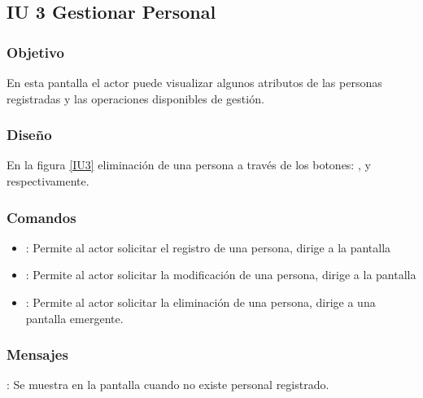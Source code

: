 \subsection{IU 3 Gestionar Personal}

\subsubsection{Objetivo}
	En esta pantalla el actor puede visualizar algunos atributos de las personas registradas y las operaciones disponibles de gestión.
\subsubsection{Diseño}
	En la figura \ref{IU3} eliminación de una persona a través de los botones: , \editar y \eliminar respectivamente.

\label{IU3}
\subsubsection{Comandos}
\begin{itemize}
	\item {}: Permite al actor solicitar el registro de una persona, dirige a la pantalla 
	\item \editar [Modificar]: Permite al actor solicitar la modificación de una persona, dirige a la pantalla 
	\item \eliminar [Eliminar]: Permite al actor solicitar la eliminación de una persona, dirige a una pantalla emergente.
\end{itemize}

\subsubsection{Mensajes}

\begin{Citemize}
	\item {}: Se muestra en la pantalla  cuando no existe personal registrado.
\end{Citemize}

